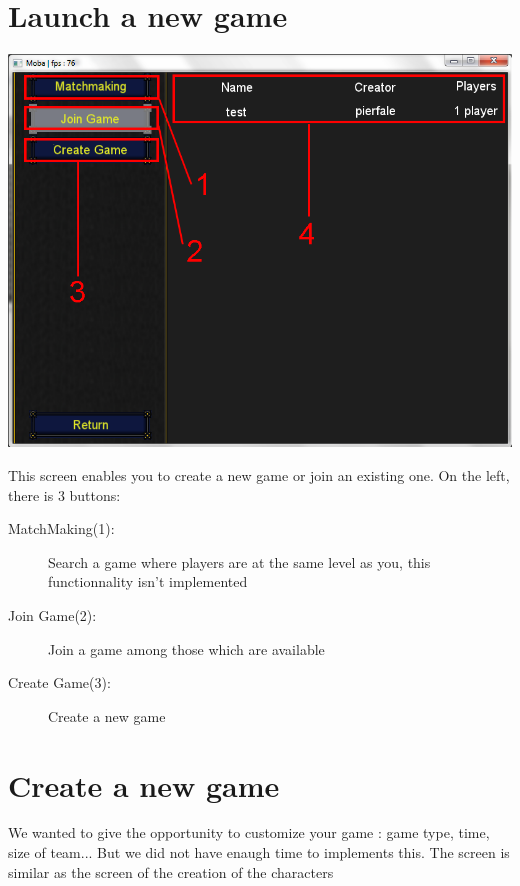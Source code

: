 \documentclass{scrreprt}
\begin{document}
			  \section{Launch a new game}
			  \begin{center}
			  \includegraphics[scale=0.4]{launch_screen.png}
			  \end{center}
			  This screen enables you to create a new game or join an existing one. On the left, there is 3 buttons:
			  \begin{description}
			  \item[MatchMaking(1):]{Search a game where players are at the same level as you, this functionnality isn't implemented}
			  \item[Join Game(2):]{Join a game among those which are available}
			  \item[Create Game(3):]{Create a new game}
			  \end{description}
			  \section{Create a new game}
			  We wanted to give the opportunity to customize your game : game type, time, size of team... But we did not have enaugh time to implements this. The screen is similar as the screen of the creation of the characters %
\end{document}
